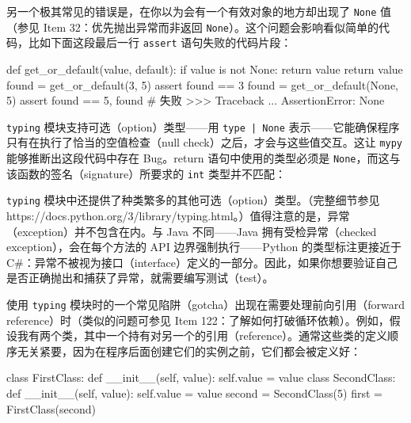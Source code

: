 另一个极其常见的错误是，在你以为会有一个有效对象的地方却出现了 \texttt{None} 值（参见 Item 32：优先抛出异常而非返回 \texttt{None}）。这个问题会影响看似简单的代码，比如下面这段最后一行 \texttt{assert} 语句失败的代码片段：

\begin{codebox}[python]
def get_or_default(value, default):
    if value is not None:
        return value
    return value
found = get_or_default(3, 5)
assert found == 3
found = get_or_default(None, 5)
assert found == 5, found  # 失败
>>>
Traceback ...
AssertionError: None
\end{codebox}

\texttt{typing} 模块支持可选（option）类型——用 \texttt{type | None} 表示——它能确保程序只有在执行了恰当的空值检查（null check）之后，才会与这些值交互。这让 \texttt{mypy} 能够推断出这段代码中存在 Bug。return 语句中使用的类型必须是 \texttt{None}，而这与该函数的签名（signature）所要求的 \texttt{int} 类型并不匹配：


\texttt{typing} 模块中还提供了种类繁多的其他可选（option）类型。（完整细节参见 https://docs.python.org/3/library/typing.html。）值得注意的是，异常（exception）并不包含在内。与 Java 不同——Java 拥有受检异常（checked exception），会在每个方法的 API 边界强制执行——Python 的类型标注更接近于 C\#：异常不被视为接口（interface）定义的一部分。因此，如果你想要验证自己是否正确抛出和捕获了异常，就需要编写测试（test）。

使用 \texttt{typing} 模块时的一个常见陷阱（gotcha）出现在需要处理前向引用（forward reference）时（类似的问题可参见 Item 122：了解如何打破循环依赖）。例如，假设我有两个类，其中一个持有对另一个的引用（reference）。通常这些类的定义顺序无关紧要，因为在程序后面创建它们的实例之前，它们都会被定义好：

\begin{codebox}[python]
class FirstClass:
    def __init__(self, value):
        self.value = value
class SecondClass:
    def __init__(self, value):
        self.value = value
second = SecondClass(5)
first = FirstClass(second)
\end{codebox}

